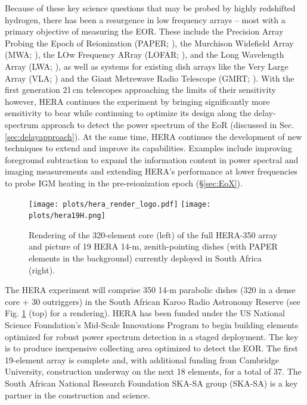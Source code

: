 \documentclass[preprint,11pt]{aastex}
\begin{document}
Because of these key science questions that may be probed by highly redshifted hydrogen, there has been a resurgence in low frequency arrays  -- most with a primary
objective of measuring the EOR.  These include the Precision Array Probing the Epoch of Reionization (PAPER; \citealt{parsons_et_al2010}), the Murchison Widefield Array (MWA; \citealt{tingay_et_al2013}), the LOw Frequency ARray (LOFAR; \citealt{2013A&A...556A...2V}), and the Long Wavelength Array (LWA; \citealt{2009IEEEP..97.1421E}), as well as systems for existing dish arrays like the Very Large Array (VLA; \citealt{2013AAS...22132804K}) and the Giant Metrewave Radio Telescope (GMRT; \citealt{paciga_et_al2011}).
With the first generation 21\,cm telescopes approaching the limits of their sensitivity however, HERA continues the experiment by bringing significantly more sensitivity to bear
while continuing to optimize its design along the delay-spectrum approach to detect the power spectrum of the EoR (discussed in Sec. \ref{sec:delayapproach}).
At the same time, HERA continues the development of new techniques to extend and improve its capabilities.
Examples include improving foreground subtraction to expand the information content 
in power spectral and imaging measurements and
extending HERA's performance at lower frequencies to probe IGM heating in the pre-reionization epoch (\S\ref{sec:EoX}).


\begin{figure}[h!]
	\centering
	\texttt{[image: plots/hera\_render\_logo.pdf]}
	\texttt{[image: plots/hera19H.png]}
	\caption{Rendering of the 320-element core (left) of the full HERA-350 array and picture of 19 HERA 14-m, zenith-pointing dishes (with PAPER elements in the background) currently deployed in South Africa (right).} 
	\label{fig:HERApictures}
\end{figure}



The HERA experiment will comprise 
350 14-m parabolic dishes (320 in a dense core $+$ 30 outriggers) in the South African Karoo Radio
Astronomy Reserve (see Fig. \ref{fig:HERApictures} (top) for a rendering).
HERA has been funded under the US National Science Foundation's Mid-Scale Innovations Program to begin building elements optimized for robust power spectrum detection in a 
staged deployment.  The key is to produce inexpensive collecting area optimized to detect the EOR.  
The first 19-element array is complete and, with additional funding from Cambridge University, construction underway on the next 18 elements, for a total of 37.
The South African National Research Foundation SKA-SA group (SKA-SA) is a key partner in the construction and science.
\end{document}
